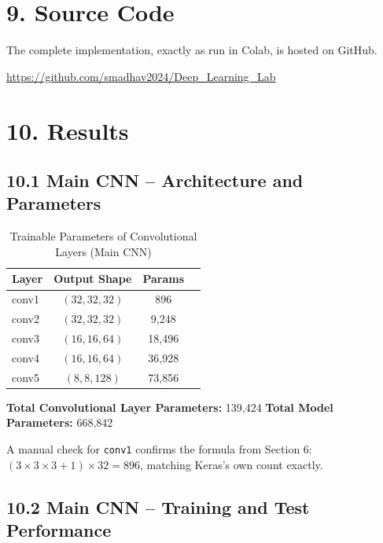 \documentclass[11pt]{article}
\begin{document}

\section*{9. Source Code}

The complete implementation, exactly as run in Colab, is hosted on GitHub.

\begin{center}
\url{https://github.com/smadhav2024/Deep_Learning_Lab}
\end{center}


\section*{10. Results}

\subsection*{10.1 Main CNN -- Architecture and Parameters}

\begin{table}[H]
\centering
\caption{Trainable Parameters of Convolutional Layers (Main CNN)}
\begin{tabular}{lccc}
\toprule
Layer & Output Shape & Params \\
\midrule
conv1 & $(32,32,32)$ & 896 \\
conv2 & $(32,32,32)$ & 9{,}248 \\
conv3 & $(16,16,64)$ & 18{,}496 \\
conv4 & $(16,16,64)$ & 36{,}928 \\
conv5 & $(8,8,128)$ & 73{,}856 \\
\bottomrule
\end{tabular}
\end{table}

\textbf{Total Convolutional Layer Parameters:} 139,424 \quad \textbf{Total Model Parameters:} 668,842

A manual check for \texttt{conv1} confirms the formula from Section 6: $(3\times3\times3+1)\times32 = 896$, matching Keras's own count exactly.

\subsection*{10.2 Main CNN -- Training and Test Performance}
\end{document}
